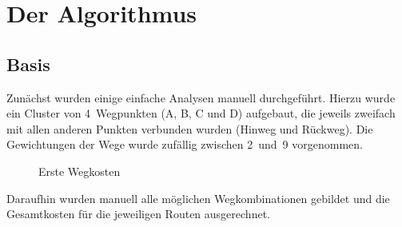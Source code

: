 \chapter{Der Algorithmus}
\label{ch:algorithmus}

\section{Basis}
\label{sec:basis}
Zunächst wurden einige einfache Analysen manuell durchgeführt. Hierzu wurde ein Cluster von 4~Wegpunkten (A, B, C und D) aufgebaut, die jeweils zweifach mit allen anderen Punkten verbunden wurden (Hinweg und Rückweg). Die Gewichtungen der Wege wurde zufällig zwischen 2~und~9 vorgenommen. 

\begin{figure}[H]
	\centering
	\caption{Erste Wegkosten
		\label{fig:erste-wegkosten}}
\end{figure}

Daraufhin wurden manuell alle möglichen Wegkombinationen gebildet und die Gesamtkosten für die jeweiligen Routen ausgerechnet. 

